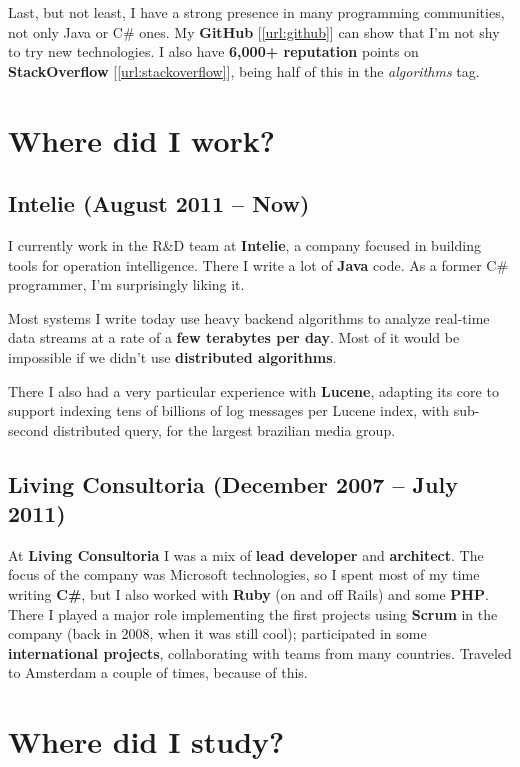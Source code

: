 \documentclass[a4paper,12pt,oneside]{article}
\begin{document}
	Last, but not least, I have a strong presence in many programming communities, not only Java or C\# ones. My \textbf{GitHub} [\ref{url:github}] can show that I'm not shy to try new technologies. I also have \textbf{6,000+ reputation} points on \textbf{StackOverflow} [\ref{url:stackoverflow}], being half of this in the \emph{algorithms} tag.

\section*{Where did I work?}

\subsection*{Intelie \small{ (August 2011 -- Now)}}

	I currently work in the R\&D team at \textbf{Intelie}, a company focused in building tools for
	operation intelligence. There I write a lot of \textbf{Java} code. As a former
	C\# programmer, I'm surprisingly liking it.

	Most systems I write today use heavy backend algorithms to analyze real-time
	data streams at a rate of a \textbf{few terabytes per day}. Most of it would be
	impossible if we didn't use \textbf{distributed algorithms}.

	There I also had a very particular experience with \textbf{Lucene}, adapting
	its core to support indexing tens of billions of log messages per Lucene
	index, with sub-second distributed query, for the largest brazilian media
	group.
\subsection*{Living Consultoria \small{ (December 2007 -- July 2011)}}

	At \textbf{Living Consultoria} I was a mix of \textbf{lead developer} and
	\textbf{architect}. The focus of the company was Microsoft technologies, so I
	spent most of my time writing \textbf{C\#}, but I also worked with
	\textbf{Ruby} (on and off Rails) and some \textbf{PHP}. There I played a major
	role implementing the first projects using \textbf{Scrum} in the company (back
	in 2008, when it was still cool); participated in some \textbf{international
	projects}, collaborating with teams from many countries. Traveled to Amsterdam
	a couple of times, because of this.

\section*{Where did I study?}
\end{document}
